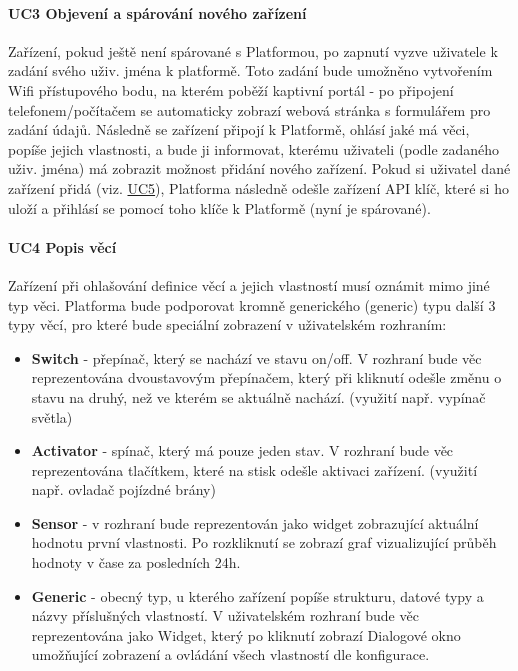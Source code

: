 \paragraph{UC3 Objevení a spárování nového zařízení}
Zařízení, pokud ještě není spárované s Platformou, po zapnutí vyzve uživatele k zadání svého uživ. jména k platformě. Toto zadání bude umožněno vytvořením Wifi přístupového bodu, na kterém poběží kaptivní portál - po připojení telefonem/počítačem se automaticky zobrazí webová stránka s formulářem pro zadání údajů. Následně se zařízení připojí k Platformě, ohlásí jaké má věci, popíše jejich vlastnosti, a bude ji informovat, kterému uživateli (podle zadaného uživ. jména) má zobrazit možnost přidání nového zařízení. Pokud si uživatel dané zařízení přidá (viz. \hyperref[UC5]{UC5}), Platforma následně odešle zařízení API klíč, které si ho uloží a přihlásí se pomocí toho klíče k Platformě (nyní je spárované).

\paragraph{UC4 Popis věcí}
Zařízení při ohlašování definice věcí a jejich vlastností musí oznámit mimo jiné typ věci. Platforma bude podporovat kromně generického (generic) typu další 3 typy věcí, pro které bude speciální zobrazení v uživatelském rozhraním:
\begin{itemize}
    \item \textbf{Switch} - přepínač, který se nachází ve stavu on/off. V rozhraní bude věc reprezentována dvoustavovým přepínačem, který při kliknutí odešle změnu o stavu na druhý, než ve kterém se aktuálně nachází. (využití např. vypínač světla)
    \item \textbf{Activator} - spínač, který má pouze jeden stav. V rozhraní bude věc reprezentována tlačítkem, které na stisk odešle aktivaci zařízení. (využití např. ovladač pojízdné brány)
    \item \textbf{Sensor} - v rozhraní bude reprezentován jako widget zobrazující aktuální hodnotu první vlastnosti. Po rozkliknutí se zobrazí graf vizualizující průběh hodnoty v čase za posledních 24h.
    \item \textbf{Generic} - obecný typ, u kterého zařízení popíše strukturu, datové typy a názvy příslušných vlastností. V uživatelském rozhraní bude věc reprezentována jako Widget, který po kliknutí zobrazí Dialogové okno umožňující zobrazení a ovládání všech vlastností dle konfigurace.
\end{itemize}


